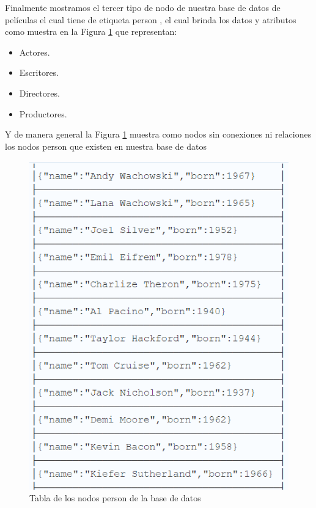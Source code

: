 Finalmente mostramos el tercer tipo de nodo de nuestra base de datos de películas el cual tiene de etiqueta person , el cual brinda los datos y atributos como muestra en la Figura \ref{fig:tab_3} que representan:
\begin{itemize}
    \item Actores.
    \item Escritores.
    \item Directores.
    \item Productores.
\end{itemize}
Y de manera general la Figura \ref{fig:tab_3} muestra como nodos sin conexiones ni relaciones los nodos person que existen en nuestra base de datos
\begin{figure}[H]
    \centering
    \includegraphics[scale=0.7]{Graficos/tab3.png}
    \caption{Tabla de los nodos person de la base de datos}
    \label{fig:tab_3}
\end{figure}
